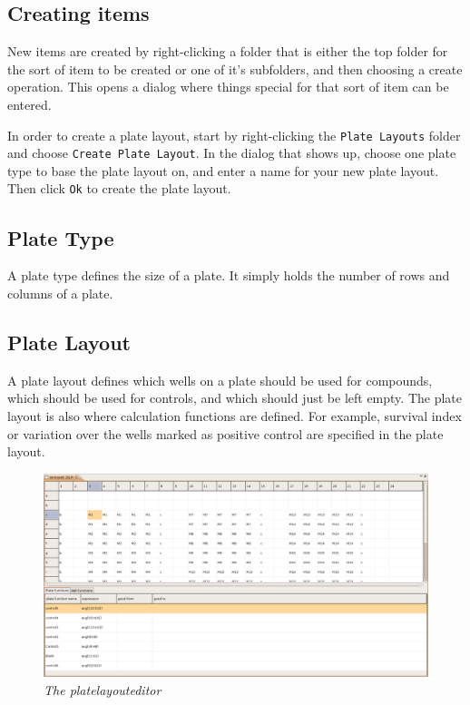 \documentclass[a4paper,10pt]{article}
\begin{document}
        \subsection{Creating items}
            New items are created by right-clicking a folder that is either the
            top folder for the sort of item to be created or one of it's
            subfolders, and then choosing a create operation. This opens a
            dialog where things special for that sort of item can be entered. 

            In order to create a plate layout, start by right-clicking the
            \texttt{Plate Layouts} folder and choose \texttt{Create Plate
            Layout}. In the dialog that shows up, choose one plate type to base
            the plate layout on, and enter a name for your new plate layout.
            Then click \texttt{Ok} to create the plate layout.

        \subsection{Plate Type} A plate type defines the size of a plate. It
            simply holds the number of rows and columns of a plate. 

        \subsection{Plate Layout}
            A plate layout defines which wells on a plate should be used for
            compounds, which should be used for controls, and which should just
            be left empty. The plate layout is also where calculation functions
            are defined. For example, survival index or variation over the
            wells marked as positive control are specified in the plate layout.

            \begin{figure}[htbp]
                \begin{center}
                    \includegraphics[width=1\textwidth]
                                    {images/plateLayoutEditor.png}
                \end{center}
                \caption{\textit{The platelayouteditor}}
                \label{platelayoutEditor}
            \end{figure}
\end{document}
